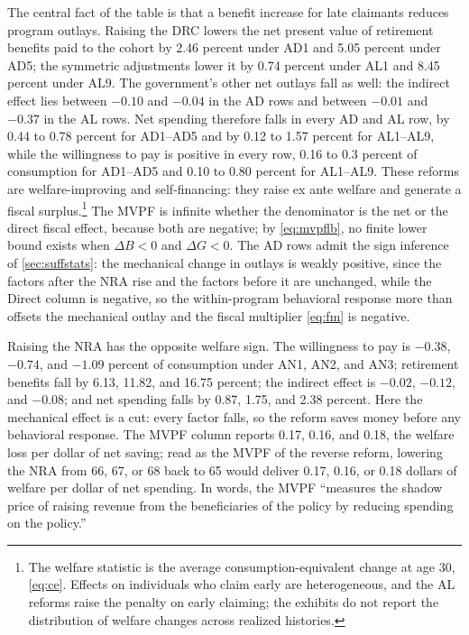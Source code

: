 The central fact of the table is that a benefit increase for late claimants reduces program outlays. Raising the DRC lowers the net present value of retirement benefits paid to the cohort by 2.46 percent under AD1 and 5.05 percent under AD5; the symmetric adjustments lower it by 0.74 percent under AL1 and 8.45 percent under AL9. %
The government's other net outlays fall as well: the indirect effect lies between $-0.10$ and $-0.04$ in the AD rows and between $-0.01$ and $-0.37$ in the AL rows. %
Net spending therefore falls in every AD and AL row, by 0.44 to 0.78 percent for AD1--AD5 and by 0.12 to 1.57 percent for AL1--AL9, while the willingness to pay is positive in every row, 0.16 to 0.3 percent of consumption for AD1--AD5 and 0.10 to 0.80 percent for AL1--AL9. %
These reforms are welfare-improving and self-financing: they raise ex ante welfare and generate a fiscal surplus.\footnote{The welfare statistic is the average consumption-equivalent change at age 30, \eqref{eq:ce}. Effects on individuals who claim early are heterogeneous, and the AL reforms raise the penalty on early claiming; the exhibits do not report the distribution of welfare changes across realized histories. %
}
The MVPF is infinite whether the denominator is the net or the direct fiscal effect, because both are negative; by \eqref{eq:mvpflb}, no finite lower bound exists when $\Delta B<0$ and $\Delta G<0$. %
The AD rows admit the sign inference of \autoref{sec:suffstats}: the mechanical change in outlays is weakly positive, since the factors after the NRA rise and the factors before it are unchanged, while the Direct column is negative, so the within-program behavioral response more than offsets the mechanical outlay and the fiscal multiplier \eqref{eq:fm} is negative. %

Raising the NRA has the opposite welfare sign. The willingness to pay is $-0.38$, $-0.74$, and $-1.09$ percent of consumption under AN1, AN2, and AN3; retirement benefits fall by 6.13, 11.82, and 16.75 percent; the indirect effect is $-0.02$, $-0.12$, and $-0.08$; and net spending falls by 0.87, 1.75, and 2.38 percent. %
Here the mechanical effect is a cut: every factor falls, so the reform saves money before any behavioral response. %
The MVPF column reports 0.17, 0.16, and 0.18, the welfare loss per dollar of net saving; read as the MVPF of the reverse reform, lowering the NRA from 66, 67, or 68 back to 65 would deliver 0.17, 0.16, or 0.18 dollars of welfare per dollar of net spending. %
In  words, the MVPF ``measures the shadow price of raising revenue from the beneficiaries of the policy by reducing spending on the policy.'' %

